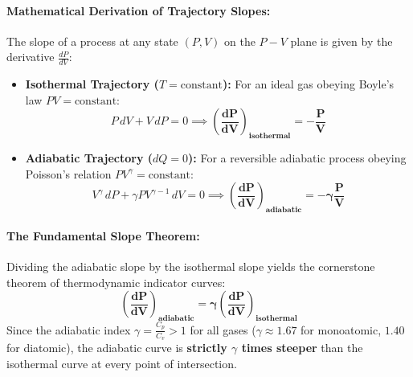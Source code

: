 \documentclass[10pt,twoside,openright]{book}
\begin{document}
\paragraph{Mathematical Derivation of Trajectory Slopes:}
The slope of a process at any state $(P, V)$ on the $P-V$ plane is given by the derivative $\frac{dP}{dV}$:
\begin{itemize}
  \item \textbf{Isothermal Trajectory ($T = \text{constant}$):} For an ideal gas obeying Boyle's law $PV = \text{constant}$:
  \begin{equation}
    P\,dV + V\,dP = 0 \implies \mathbf{\left(\frac{dP}{dV}\right)_{\text{isothermal}} = -\frac{P}{V}}
  \end{equation}
  \item \textbf{Adiabatic Trajectory ($dQ = 0$):} For a reversible adiabatic process obeying Poisson's relation $P V^\gamma = \text{constant}$:
  \begin{equation}
    V^\gamma\,dP + \gamma P V^{\gamma-1}\,dV = 0 \implies \mathbf{\left(\frac{dP}{dV}\right)_{\text{adiabatic}} = -\gamma \frac{P}{V}}
  \end{equation}
\end{itemize}

\paragraph{The Fundamental Slope Theorem:}
Dividing the adiabatic slope by the isothermal slope yields the cornerstone theorem of thermodynamic indicator curves:
\begin{equation}
  \mathbf{\left(\frac{dP}{dV}\right)_{\text{adiabatic}} = \gamma \left(\frac{dP}{dV}\right)_{\text{isothermal}}}
\end{equation}
Since the adiabatic index $\gamma = \frac{C_p}{C_v} > 1$ for all gases ($\gamma \approx 1.67$ for monoatomic, $1.40$ for diatomic), the adiabatic curve is \textbf{strictly $\gamma$ times steeper} than the isothermal curve at every point of intersection.
\end{document}
